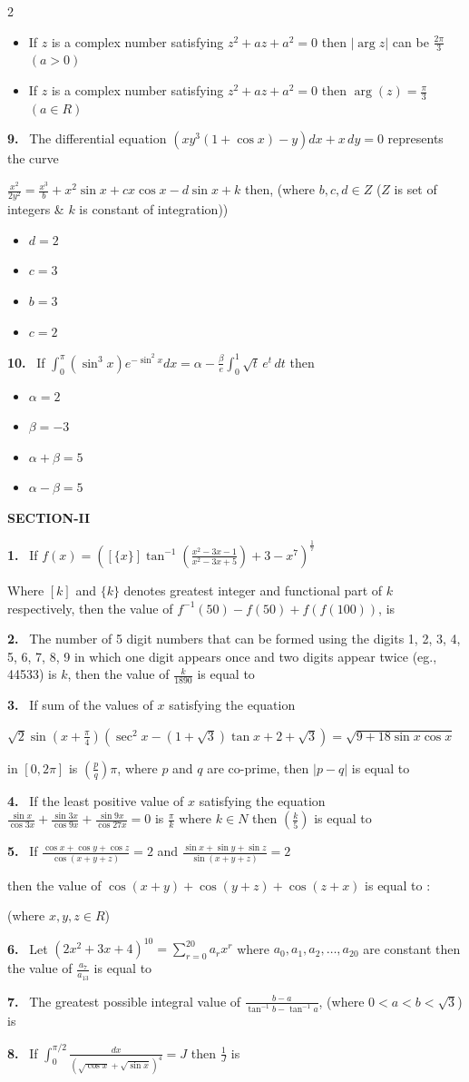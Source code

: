 \documentclass[10pt]{extarticle}
\newcommand{\sect}[1]{\par\smallskip\noindent\textbf{#1}\par}
\newcommand{\qn}[1]{\par\smallskip\noindent\textbf{#1.}~}
\newenvironment{qoptions}{\begin{itemize}[leftmargin=1.8em,itemsep=1pt,topsep=2pt,label={}]}{\end{itemize}}
\newcommand{\opt}[2]{\item[(#1)] #2}
\begin{document}
\begin{multicols}{2}
\begin{qoptions}
\opt{C}{If $z$ is a complex number satisfying $z^2+az+a^2=0$ then $|\arg z|$ can be $\frac{2\pi}{3}$ $(a>0)$}
\opt{D}{If $z$ is a complex number satisfying $z^2+az+a^2=0$ then $\arg(z)=\frac\pi3$ $(a\in R)$}
\end{qoptions}
\qn{9} The differential equation $(xy^3(1+\cos x)-y)dx+x\,dy=0$ represents the curve\par
$\frac{x^2}{2y^2}=\frac{x^3}{b}+x^2\sin x+cx\cos x-d\sin x+k$ then, (where $b,c,d\in Z$ ($Z$ is set of integers \& $k$ is constant of integration))
\begin{qoptions}
\opt{A}{$d=2$}
\opt{B}{$c=3$}
\opt{C}{$b=3$}
\opt{D}{$c=2$}
\end{qoptions}
\qn{10} If $\displaystyle\int_0^{\pi}(\sin^3x)e^{-\sin^2x}dx=\alpha-\frac{\beta}{e}\int_0^1\sqrt t\,e^t\,dt$ then
\begin{qoptions}
\opt{A}{$\alpha=2$}
\opt{B}{$\beta=-3$}
\opt{C}{$\alpha+\beta=5$}
\opt{D}{$\alpha-\beta=5$}
\end{qoptions}
\sect{SECTION-II}
\qn{1} If $f(x)=\left(\left[\{x\}\right]\tan^{-1}\left(\frac{x^2-3x-1}{x^2-3x+5}\right)+3-x^7\right)^{\frac17}$\par
Where $[k]$ and $\{k\}$ denotes greatest integer and functional part of $k$ respectively, then the value of $f^{-1}(50)-f(50)+f(f(100))$, is
\qn{2} The number of 5 digit numbers that can be formed using the digits 1, 2, 3, 4, 5, 6, 7, 8, 9 in which one digit appears once and two digits appear twice (eg., 44533) is $k$, then the value of $\frac{k}{1890}$ is equal to
\qn{3} If sum of the values of $x$ satisfying the equation\par
$\sqrt2\sin\left(x+\frac\pi4\right)\left(\sec^2x-(1+\sqrt3)\tan x+2+\sqrt3\right)=\sqrt{9+18\sin x\cos x}$\par
in $[0,2\pi]$ is $\left(\frac pq\right)\pi$, where $p$ and $q$ are co-prime, then $|p-q|$ is equal to
\qn{4} If the least positive value of $x$ satisfying the equation $\frac{\sin x}{\cos3x}+\frac{\sin3x}{\cos9x}+\frac{\sin9x}{\cos27x}=0$ is $\frac{\pi}{k}$ where $k\in N$ then $\left(\frac k5\right)$ is equal to
\qn{5} If $\frac{\cos x+\cos y+\cos z}{\cos(x+y+z)}=2$ and $\frac{\sin x+\sin y+\sin z}{\sin(x+y+z)}=2$\par
then the value of $\cos(x+y)+\cos(y+z)+\cos(z+x)$ is equal to :\par
(where $x,y,z\in R$)
\qn{6} Let $(2x^2+3x+4)^{10}=\displaystyle\sum_{r=0}^{20}a_rx^r$ where $a_0,a_1,a_2,\ldots,a_{20}$ are constant then the value of $\frac{a_7}{a_{13}}$ is equal to
\qn{7} The greatest possible integral value of $\frac{b-a}{\tan^{-1}b-\tan^{-1}a}$, (where $0<a<b<\sqrt3$) is
\qn{8} If $\displaystyle\int_0^{\pi/2}\frac{dx}{(\sqrt{\cos x}+\sqrt{\sin x})^4}=J$ then $\frac1J$ is
\end{multicols}
\end{document}
